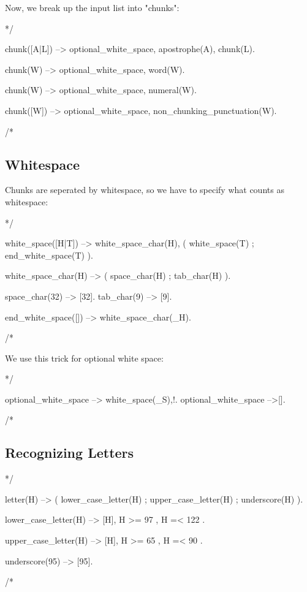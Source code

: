 \documentclass{book}[9pt]
\newenvironment{code}%
{\small \verbatim}%
{\endverbatim \large}
\begin{document}
Now, we break up the input list into "chunks":

\begin{code}
*/

chunk([A|L]) -->
        optional_white_space,
        apostrophe(A),
        chunk(L).

chunk(W) -->
        optional_white_space,
        word(W).

chunk(W) -->
        optional_white_space,
        numeral(W).

chunk([W]) -->
        optional_white_space,
        non_chunking_punctuation(W).

/*
\end{code}

\subsection{Whitespace}

Chunks are seperated by whitespace, so we have to specify what counts as
whitespace:

\begin{code}
*/

white_space([H|T]) -->
        white_space_char(H),
        (
          white_space(T)
        ;
          end_white_space(T)
        ).

white_space_char(H) -->
        (
          space_char(H)
        ;
          tab_char(H)
        ).

space_char(32) --> [32].
tab_char(9)    --> [9].

end_white_space([]) --> \+ white_space_char(_H).

/*
\end{code}

We use this trick for optional white space:

\begin{code}
*/

optional_white_space --> white_space(_S),!.
optional_white_space -->[].

/*
\end{code}

\subsection{Recognizing Letters}

\begin{code}
*/

letter(H) -->
        (
          lower_case_letter(H)
        ;
          upper_case_letter(H)
        ;
          underscore(H)
        ).


lower_case_letter(H) -->
        [H],
        { H >= 97  },
        { H =< 122 }.

upper_case_letter(H) -->
        [H],
        { H >= 65 },
        { H =< 90 }.

underscore(95) --> [95].

/*
\end{code}
\end{document}
